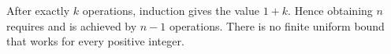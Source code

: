 After exactly $ k $ operations, induction gives the value $ 1+k $. Hence obtaining $ n $ requires and is achieved by $\boxed{n-1}$ operations. There is no finite uniform bound that works for every positive integer.
